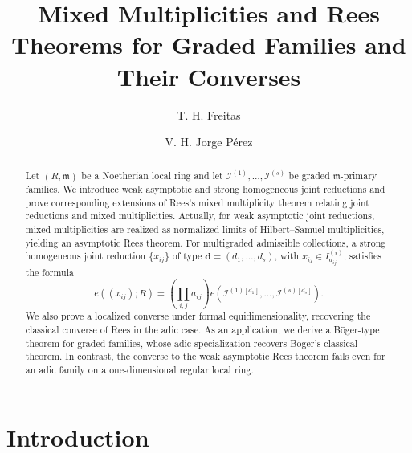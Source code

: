 \documentclass[reqno,12pt]{amsart}
\theoremstyle{plain}
\theoremstyle{definition}
\theoremstyle{remark}
\numberwithin{equation}{section}
\begin{document}
\title{Mixed Multiplicities and Rees Theorems for Graded Families and Their Converses}
\date{}

\author{T. H. Freitas}
\address{Universidade Tecnol\'ogica Federal do Paran\'a, 85053-525, Guarapuava-PR, Brazil}

\author{V. H. Jorge P\'erez}
\address{Universidade de S{\~a}o Paulo -- ICMC, 13560-970, S{\~a}o Carlos-SP, Brazil}




\begin{abstract}

Let $(R,\mathfrak m)$ be a Noetherian local ring and let
$\mathcal I^{(1)},\ldots,\mathcal I^{(s)}$ be graded
$\mathfrak m$-primary families. We introduce weak asymptotic and strong
homogeneous joint reductions and prove corresponding extensions of
Rees's mixed multiplicity theorem relating joint reductions and mixed
multiplicities. Actually, for weak asymptotic joint reductions, mixed
multiplicities are realized as normalized limits of Hilbert--Samuel
multiplicities, yielding an asymptotic Rees theorem. For multigraded
admissible collections, a strong homogeneous joint reduction
$\{x_{ij}\}$ of type $\mathbf d=(d_1,\ldots,d_s)$, with
$x_{ij}\in I_{a_{ij}}^{(i)}$, satisfies the formula
\[
e((x_{ij});R)
=
\left(\prod_{i,j}a_{ij}\right)
e\!\left(
\mathcal I^{(1)[d_1]},\ldots,
\mathcal I^{(s)[d_s]}
\right).
\]
 We also prove a localized converse under formal equidimensionality,
recovering the classical converse of Rees in the adic case. As an application, we derive 
a B\"oger-type theorem for graded families, whose adic specialization recovers
B\"oger's classical theorem. In contrast, the converse to the weak asymptotic Rees theorem
 fails even for an adic family on a
one-dimensional regular local ring.
\end{abstract}



\maketitle

\section{Introduction}
\end{document}
